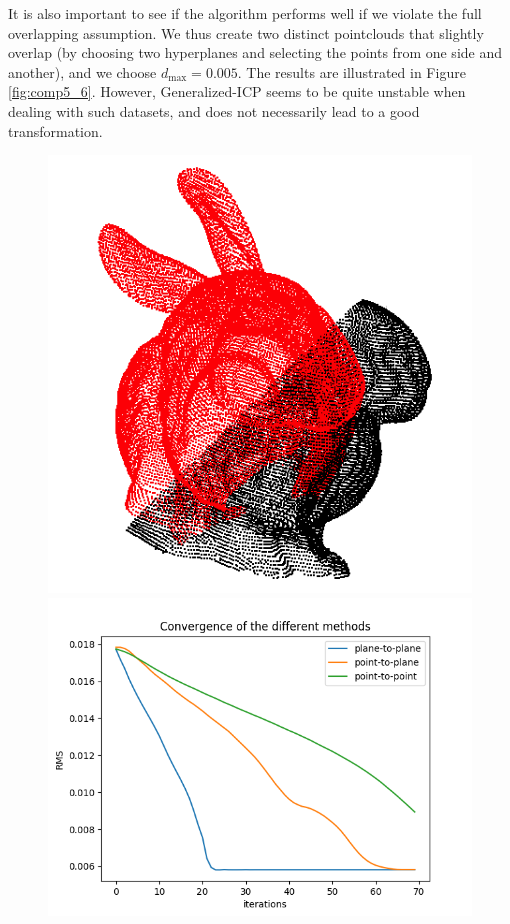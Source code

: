 \documentclass[11pt,letterpaper,leqno]{article}
\begin{document}
It is also important to see if the algorithm performs well if we violate the full overlapping assumption. We thus create two distinct pointclouds that slightly overlap (by choosing two hyperplanes and selecting the points from one side and another), and we choose $d_{\max} = 0.005$. The results are illustrated in Figure \ref{fig:comp5_6}. However, Generalized-ICP seems to be quite unstable when dealing with such datasets, and does not necessarily lead to a good transformation.
\begin{figure}[ht!]
    \centering
    \begin{minipage}{0.4\linewidth}
    \includegraphics[width=\linewidth]{img/comparison_5_clouds.png}
    \end{minipage}\hfill
    \begin{minipage}{0.5\linewidth}
    \includegraphics[width=\linewidth]{img/comparison_5.png}

\end{minipage}
\end{figure}
\end{document}
